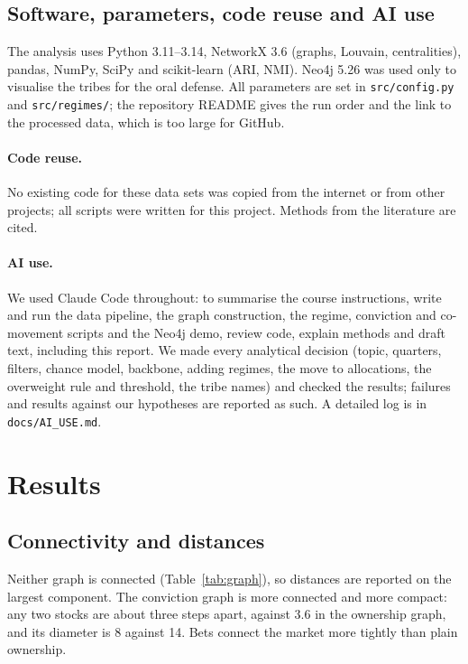\documentclass[10pt,a4paper]{article}
\begin{document}
\subsection{Software, parameters, code reuse and AI use}
The analysis uses Python 3.11--3.14, NetworkX 3.6 \cite{hagberg2008} (graphs, Louvain, centralities), pandas, NumPy, SciPy and scikit-learn (ARI, NMI). Neo4j 5.26 \cite{neo4j} was used only to visualise the tribes for the oral defense. All parameters are set in \texttt{src/config.py} and \texttt{src/regimes/}; the repository README \cite{repo} gives the run order and the link to the processed data, which is too large for GitHub.

\paragraph{Code reuse.} No existing code for these data sets was copied from the internet or from other projects; all scripts were written for this project. Methods from the literature are cited.

\paragraph{AI use.} We used Claude Code \cite{claudecode} throughout: to summarise the course instructions, write and run the data pipeline, the graph construction, the regime, conviction and co-movement scripts and the Neo4j demo, review code, explain methods and draft text, including this report. We made every analytical decision (topic, quarters, filters, chance model, backbone, adding regimes, the move to allocations, the overweight rule and threshold, the tribe names) and checked the results; failures and results against our hypotheses are reported as such. A detailed log is in \texttt{docs/AI\_USE.md}.

\section{Results}
\subsection{Connectivity and distances}
Neither graph is connected (Table~\ref{tab:graph}), so distances are reported on the largest component. The conviction graph is more connected and more compact: any two stocks are about three steps apart, against 3.6 in the ownership graph, and its diameter is 8 against 14. Bets connect the market more tightly than plain ownership.
\end{document}
